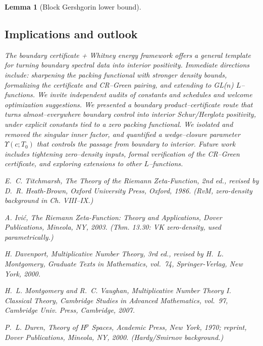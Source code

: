 \documentclass[11pt]{article}
\newtheorem{lemma}{Lemma}[section]
\theoremstyle{definition}
\theoremstyle{remark}
\begin{document}
\begin{lemma}[Block Gershgorin lower bound]
\subsection*{Implications and outlook}
The boundary certificate + Whitney energy framework offers a general template for turning boundary spectral data into interior positivity. Immediate directions include: sharpening the packing functional with stronger density bounds, formalizing the certificate and CR--Green pairing, and extending to GL($n$) $L$--functions. We invite independent audits of constants and schedules and welcome optimization suggestions.
\label{sec:concl} %
We presented a boundary product--certificate route that turns almost--everywhere boundary control into interior Schur/Herglotz positivity, 
under explicit constants tied to a zero packing functional. We isolated and removed the singular inner factor, 
and quantified a wedge--closure parameter $\Upsilon(c;T_0)$ that controls the passage from boundary to interior.
Future work includes tightening zero--density inputs, formal verification of the CR--Green certificate, and exploring extensions to other $L$--functions.

\par\normalfont\normalsize
\begin{thebibliography}{99}
\makeatletter\setcounter{NAT@ctr}{0}\setcounter{enumiv}{0}\makeatother{} E.~C. Titchmarsh, \emph{The Theory of the Riemann Zeta-Function}, 2nd ed., revised by D.~R. Heath-Brown, Oxford University Press, Oxford, 1986. (RvM, zero-density background in Ch. VIII--IX.)




 A. Ivi\'c, \emph{The Riemann Zeta-Function: Theory and Applications}, Dover Publications, Mineola, NY, 2003. (Thm. 13.30: VK zero-density, used parametrically.)




 H. Davenport, \emph{Multiplicative Number Theory}, 3rd ed., revised by H.~L. Montgomery, Graduate Texts in Mathematics, vol.~74, Springer-Verlag, New York, 2000.




 H.~L. Montgomery and R.~C. Vaughan, \emph{Multiplicative Number Theory I. Classical Theory}, Cambridge Studies in Advanced Mathematics, vol.~97, Cambridge Univ. Press, Cambridge, 2007.




 P.~L. Duren, \emph{Theory of $H^p$ Spaces}, Academic Press, New York, 1970; reprint, Dover Publications, Mineola, NY, 2000. (Hardy/Smirnov background.)





\end{thebibliography}
\end{lemma}
\end{document}
